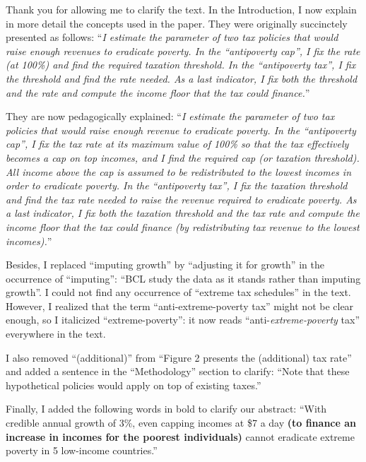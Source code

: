 \documentclass[12pt,english]{article}
\begin{document}

Thank you for allowing me to clarify the text. In the Introduction, I now explain in more detail the concepts used in the paper. They were originally succinctely presented as follows: ``\textit{I estimate the parameter of two tax policies that would raise enough revenues to eradicate poverty. In the ``antipoverty cap'', I fix the rate (at 100\%) and find the required taxation threshold. In the ``antipoverty tax'', I fix the threshold and find the rate needed. As a last indicator, I fix both the threshold and the rate and compute the income floor that the tax could finance.}'' 

They are now pedagogically explained: ``\textit{I estimate the parameter of two tax policies that would raise enough revenue to eradicate poverty. In the ``antipoverty cap'', I fix the tax rate at its maximum value of 100\% so that the tax effectively becomes a cap on top incomes, and I find the required cap (or taxation threshold). All income above the cap is assumed to be redistributed to the lowest incomes in order to eradicate poverty. In the ``antipoverty tax'', I fix the taxation threshold and find the tax rate needed to raise the revenue required to eradicate poverty. As a last indicator, I fix both the taxation threshold and the tax rate and compute the income floor that the tax could finance (by redistributing tax revenue to the lowest incomes).}''

Besides, I replaced ``imputing growth'' by ``adjusting it for growth'' in the occurrence of ``imputing'': ``BCL study the data as it stands rather than imputing growth''. I could not find any occurrence of ``extreme tax schedules'' in the text. However, I realized that the term ``anti-extreme-poverty tax'' might not be clear enough, so I italicized ``extreme-poverty'': it now reads ``anti-\textit{extreme-poverty} tax'' everywhere in the text.

I also removed ``(additional)'' from ``Figure 2 presents the (additional) tax rate'' and added a sentence in the ``Methodology'' section to clarify: ``Note that these hypothetical policies would apply on top of existing taxes.'' 

Finally, I added the following words in bold to clarify our abstract: ``With credible annual growth of 3\%, even capping incomes at \$7 a day \textbf{(to finance an increase in incomes for the poorest individuals)} cannot eradicate extreme poverty in 5 low-income countries.''
\end{document}

